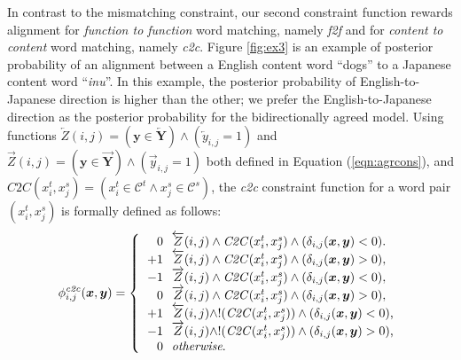 \documentclass[english]{jnlp_1.4}
\begin{document}
In contrast to the mismatching constraint,  our second constraint function rewards alignment for \textit{function to function} word matching, namely \textit{f2f} and for \textit{content to content} word matching, namely \textit{c2c}.
\mbox{Figure} \ref{fig:ex3} is an example of posterior probability of an alignment between a English content word ``dogs'' to a Japanese content word ``\textit{inu}''.
In this example, the posterior probability of English-to-Japanese direction is higher than the other; we prefer the English-to-Japanese direction as the posterior probability for the bidirectionally agreed model.
Using functions $\overleftarrow{Z}(i,j)=(\boldsymbol{y} \in \overleftarrow{\boldsymbol{Y}}) \land (\overleftarrow{y}_{i,j}=1)$ and $\overrightarrow{Z}(i,j)=(\boldsymbol{y} \in \overrightarrow{\boldsymbol{Y}}) \land (\overrightarrow{y}_{i,j}=1)$ both defined in Equation (\ref{eqn:agrcons}), and $\mathit{C2C}(x^t_i, x^s_j) = (x^t_i \in \mathcal{C}^t \land x^s_j \in \mathcal{C}^s)$, the \textit{c2c}  constraint function for a word pair $(x^t_i, x^s_j)$ 
\pagebreak
is formally defined as follows:
\begin{equation} 
 \label{eqn:increase}
 \phi^{\mathit{c2c}}_{i, j}(\boldsymbol{x},\boldsymbol{y}) = \left\{
  \begin{tabular}{rl}
  $0$ & \!\!\!\!\! $\overleftarrow{Z}(i,j)  \land \mathit{C2C}(x^t_i, x^s_j) \land (\delta_{i,j}(\boldsymbol{x}, \boldsymbol{y}) < 0 ).$ \\
  $+1$   & \!\!\!\!\! $\overleftarrow{Z}(i,j)  \land \mathit{C2C}(x^t_i, x^s_j) \land (\delta_{i,j}(\boldsymbol{x}, \boldsymbol{y}) > 0 ),$ \\
  $-1$   & \!\!\!\!\! $\overrightarrow{Z}(i,j) \land \mathit{C2C}(x^t_i, x^s_j) \land (\delta_{i,j}(\boldsymbol{x}, \boldsymbol{y}) < 0 ),$ \\
  $0$  & \!\!\!\!\! $\overrightarrow{Z}(i,j) \land \mathit{C2C}(x^t_i, x^s_j) \land (\delta_{i,j}(\boldsymbol{x}, \boldsymbol{y}) > 0 ),$ \\
  $+1$ & \!\!\!\!\! $\overleftarrow{Z}(i,j) \land !(\mathit{C2C}(x^t_i, x^s_j)) \land (\delta_{i,j}(\boldsymbol{x}, \boldsymbol{y}) < 0 )$, \\
  $-1$  & \!\!\!\!\! $\overrightarrow{Z}(i,j) \land !(\mathit{C2C}(x^t_i, x^s_j)) \land (\delta_{i,j}(\boldsymbol{x}, \boldsymbol{y}) > 0 ) $, \\
  $0$   & \!\!\!\!\! \textit{otherwise}. \\
  \end{tabular}
 \right.
\end{equation}
\end{document}
